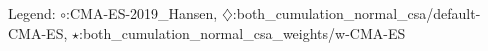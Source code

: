 Legend: {\color{CornflowerBlue}$\circ$}:CMA-ES-2019\_Hansen, {\color{Orange}$\diamondsuit$}:both\_cumulation\_normal\_csa/default-CMA-ES, {\color{Green}$\star$}:both\_cumulation\_normal\_csa\_weights/w-CMA-ES